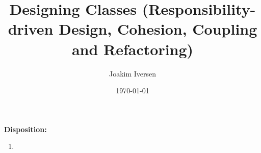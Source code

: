 \documentclass{article}
\title{Designing Classes (Responsibility-driven Design, Cohesion, Coupling and Refactoring)}
\author{Joakim Iversen}
\date{\today}
\begin{document}
\maketitle
\newpage

\textbf{\Large Disposition:}
\begin{enumerate}
    \item 
\end{enumerate}
\end{document}
